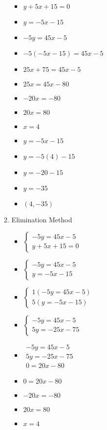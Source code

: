 \begin{enumerate}
\begin{enumerate}
\begin{itemize}
    \item $y+5x+15=0$
    \item $y=-5x-15$
    \item $-5y=45x-5$
    \item $-5(-5x-15)=45x-5$
    \item $25x+75=45x-5$
    \item $25x=45x-80$
    \item $-20x=-80$
    \item $20x=80$
    \item $x=4$
    \item $y=-5x-15$
    \item $y=-5(4)-15$
    \item $y=-20-15$
    \item $y=-35$
    \item $(4,-35)$
    \end{itemize}
  \item Elimination Method
    \begin{itemize}
    \item $\left\{ \begin{array}{l}
          -5y=45x-5 \\
          y+5x+15=0 \end{array} \right.$
    \item $\left\{ \begin{array}{l}
          -5y=45x-5 \\
          y=-5x-15 \end{array} \right.$
    \item $\left\{ \begin{array}{l}
          1(-5y=45x-5) \\
          5(y=-5x-15) \end{array} \right.$
    \item $\left\{ \begin{array}{l}
          -5y=45x-5 \\
          5y=-25x-75 \end{array} \right.$
    \item $\begin{array}{l}
          -5y=45x-5 \\
          5y=-25x-75 \\ \hline
          0=20x-80 \end{array}$
    \item $0=20x-80$
    \item $-20x=-80$
    \item $20x=80$
    \item $x=4$

\end{itemize}
\end{enumerate}
\end{enumerate}
